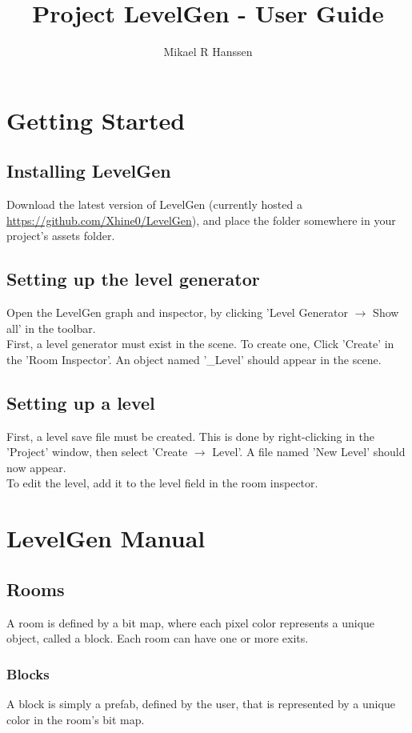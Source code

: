 \documentclass[a4paper]{article}
\begin{document}
	\title{Project LevelGen - User Guide}
	\author{Mikael R Hanssen}
	\maketitle
	
	\tableofcontents
	\newpage
	
	\section{Getting Started}
	\subsection{Installing LevelGen}
	Download the latest version of LevelGen (currently hosted a \url{https://github.com/Xhine0/LevelGen}), and place the folder somewhere in your project's assets folder.
	\subsection{Setting up the level generator}
	Open the LevelGen graph and inspector, by clicking 'Level Generator $\rightarrow$ Show all' in the toolbar. 
	\\First, a level generator must exist in the scene. To create one, Click 'Create' in the 'Room Inspector'. An object named '\_Level' should appear in the scene.
	\subsection{Setting up a level}
	First, a level save file must be created. This is done by right-clicking in the 'Project' window, then select 'Create $\rightarrow$ Level'. A file named 'New Level' should now appear. 
	\\ To edit the level, add it to the level field in the room inspector.
	
	\section{LevelGen Manual}
	\subsection{Rooms}
	A room is defined by a bit map, where each pixel color represents a unique object, called a block. Each room can have one or more exits.
	\subsubsection{Blocks}
	A block is simply a prefab, defined by the user, that is represented by a unique color in the room's bit map.
\end{document}
